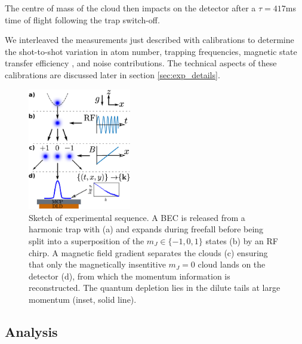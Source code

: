 	The centre of mass of the cloud then impacts on the detector after a $\tau = 417$ms time of flight following the trap switch-off.
	
	We interleaved the measurements just described with calibrations to determine the shot-to-shot variation in atom number, trapping frequencies, magnetic state transfer efficiency , and noise contributions.
	The technical aspects of these calibrations are discussed later in section \ref{sec:exp_details}.

	


	\begin{figure}[t]
	    \includegraphics[width=0.4\textwidth]{fig/depletion/exp_cartoon}
	    \caption{Sketch of experimental sequence.
	A BEC is released from a harmonic trap with (a) and expands during freefall before being split into a superposition of the $m_J\in\{-1,0,1\}$ states (b) by an RF chirp.
	A magnetic field gradient separates the clouds (c) ensuring that only the magnetically insentitive $m_J=0$ cloud lands on the detector (d), from which the momentum information is reconstructed.
	The quantum depletion lies in the dilute tails at large momentum (inset, solid line).}
	    \label{fig:sequence}
	\end{figure}

	


\subsection{Analysis} 

